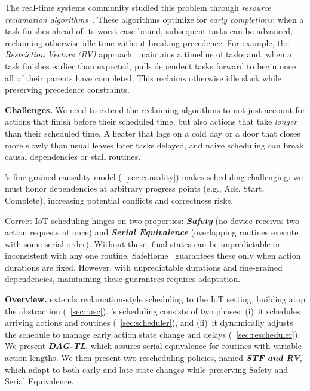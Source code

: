 The real-time systems community studied this problem through
\emph{resource reclamation algorithms}~\cite{shen1993resource,manimaran1997new,gupta2000new}.
These algorithms optimize for \emph{early completions}:
when a task finishes ahead of its worst-case bound, subsequent tasks can
be advanced, reclaiming otherwise idle time without breaking precedence.
For example, the \emph{Restriction Vectors (RV)} approach~\cite{manimaran1997new}
maintains a timeline of tasks and, when a task finishes earlier than expected, pulls dependent tasks forward to begin once all of their parents have completed. This reclaims otherwise idle slack while preserving precedence constraints.

\noindent\textbf{Challenges.} 
We need to extend the reclaiming algorithms to not just account for actions that finish before their scheduled time, but also actions that take {\it longer} than their scheduled time.
A heater that lags on a cold day or a door that closes
more slowly than usual leaves later tasks delayed, and naive scheduling
can break causal dependencies or stall routines. 

\sysname's fine-grained causality model (\Section~\ref{sec:causality}) makes scheduling challenging:
we must honor dependencies at arbitrary progress points (e.g., Ack, Start, Complete), increasing potential conflicts and correctness risks.

Correct IoT scheduling hinges on two properties: \textbf{\textit{Safety}} (no device receives two action requests at once) and \textbf{\textit{Serial Equivalence}} (overlapping routines execute with some serial order). Without these, final states can be unpredictable or inconsistent with any one routine. SafeHome~\cite{SafeHomeEuroSys2021} guarantees these only when action durations are fixed.
However, with unpredictable durations and fine-grained dependencies, maintaining these guarantees requires adaptation.

\noindent\textbf{Overview.} 
\sysname{} extends reclamation-style scheduling to the IoT setting,
building atop the \abs{} abstraction (\Section~\ref{sec:rasc}).
\sysname's scheduling  consists of two phases:
(i)~it schedules arriving actions and routines (\Section~\ref{sec:scheduler}), and
(ii)~it dynamically adjusts the schedule to manage early action state change and delays (\Section~\ref{sec:rescheduler}). 
{
We present \textbf{\textit{DAG-TL}}, which assures serial equivalence for routines with variable action lengths. 
We then present two rescheduling policies, named \textbf{\textit{STF and RV}}, which 
adapt to both early and late state changes while preserving
Safety and Serial Equivalence.
}

